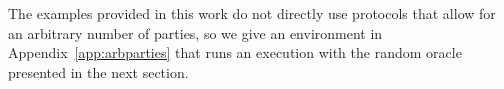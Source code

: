 The examples provided in this work do not directly use protocols that allow for an arbitrary number of parties, so we give an environment in Appendix~\ref{app:arbparties} that runs an execution with the random oracle \Fro presented in the next section.

%
%
%
